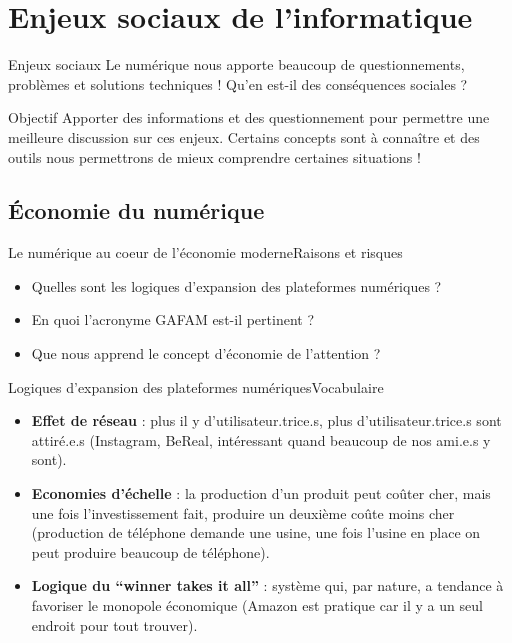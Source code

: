 \documentclass{beamer}
\begin{document}
\section{Enjeux sociaux de l'informatique}


\begin{frame}{Enjeux sociaux}{}
	Le numérique nous apporte beaucoup de questionnements, problèmes et solutions techniques ! Qu'en est-il des conséquences sociales ?
	\begin{block}{Objectif}
		Apporter des informations et des questionnement pour permettre une meilleure discussion sur ces enjeux. Certains concepts sont à connaître et des outils nous permettrons de mieux comprendre certaines situations !
	\end{block}
\end{frame}

\subsection{Économie du numérique}

\begin{frame}{Le numérique au coeur de l'économie moderne}{Raisons et risques}
	\begin{itemize}
		\item Quelles sont les logiques d’expansion des plateformes numériques ?
		\item En quoi l’acronyme GAFAM est-il pertinent ?
		\item Que nous apprend le concept d’économie de l’attention ?
	\end{itemize}
\end{frame}

\begin{frame}{Logiques d'expansion des plateformes numériques}{Vocabulaire}
	\begin{itemize}
		\item \textbf{Effet de réseau} : plus il y d'utilisateur.trice.s, plus d'utilisateur.trice.s sont attiré.e.s (Instagram, BeReal, intéressant quand beaucoup de nos ami.e.s y sont).
		\item<2-> \textbf{Economies d'échelle} : la production d'un produit peut coûter cher, mais une fois l'investissement fait, produire un deuxième coûte moins cher (production de téléphone demande une usine, une fois l'usine en place on peut produire beaucoup de téléphone).
		\item<3-> \textbf{Logique du ``winner takes it all''} : système qui, par nature, a tendance à favoriser le monopole économique (Amazon est pratique car il y a un seul endroit pour tout trouver).
	\end{itemize}
\end{frame}
\end{document}
